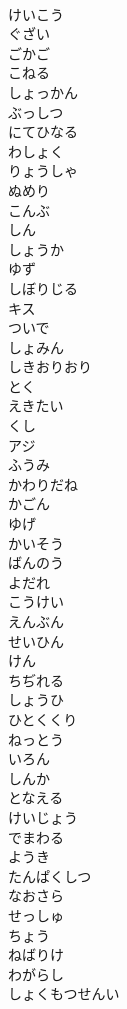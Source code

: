 \documentclass[8pt]{extreport}
\begin{document}
\begin{CJK}{UTF8}{min}
\\	けいこう
\\	ぐざい
\\	ごかご
\\	こねる
\\	しょっかん
\\	ぶっしつ
\\	にてひなる
\\	わしょく
\\	りょうしゃ
\\	ぬめり
\\	こんぶ 
\\	しん
\\	しょうか
\\	ゆず
\\	しぼりじる
\\	キス
\\	ついで
\\	しょみん
\\	しきおりおり
\\	とく
\\	えきたい
\\	くし
\\	アジ
\\	ふうみ
\\	かわりだね
\\	かごん
\\	ゆげ
\\	かいそう
\\	ばんのう
\\	よだれ
\\	こうけい
\\	えんぶん
\\	せいひん
\\	けん
\\	ちぢれる
\\	しょうひ
\\	ひとくくり
\\	ねっとう
\\	いろん
\\	しんか
\\	となえる
\\	けいじょう
\\	でまわる
\\	ようき
\\	たんぱくしつ
\\	なおさら
\\	せっしゅ
\\	ちょう
\\	ねばりけ
\\	わがらし
\\	しょくもつせんい

\end{CJK}
\end{document}
